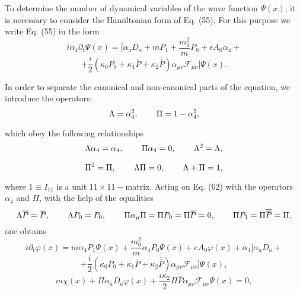 \documentclass[a4paper,12pt]{article}
\begin{document}
To determine the number of dynamical variables of the wave
function $\Psi(x)$, it is necessary to consider the Hamiltonian
form of Eq. (55). For this purpose we write Eq. (55) in the form
\[
i\alpha _4\partial _t\Psi (x)=\biggl [\alpha
_aD_a+mP_1+\frac{m_0^2}{m}P_0+eA_0\alpha _4+
\]
\vspace{-8mm}
\begin{equation}
\label{62}
\end{equation}
\vspace{-8mm}
\[
+\frac i2\left( \kappa _0P_0+\kappa _1\overline{P}+\kappa
_2\overline{ \overline{P}}\right) \alpha _{\mu \nu
}\mathcal{F}_{\mu \nu }\biggr ]\Psi (x).
\]

In order to separate the canonical and non-canonical parts of the
equation, we introduce the operators:
\begin{equation}
\Lambda =\alpha _4^2,\hspace{0.3in}\Pi =1-\alpha _4^2, \label{63}
\end{equation}

which obey the following relationships
\[
\Lambda \alpha _4=\alpha _4,\hspace{0.3in}\Pi \alpha
_4=0,\hspace{0.3in} \Lambda^2=\Lambda,
\]
\vspace{-8mm}
\begin{equation}
\label{64}
\end{equation}
\vspace{-8mm}
\[
\Pi^2=\Pi,\hspace{0.3in}\Lambda \Pi=0,\hspace{0.3in}\Lambda +\Pi
=1,
\]

where $1\equiv I_{11}$ is a unit $11\times 11-$matrix. Acting on
Eq. (62) with the operators $\alpha _4$ and $\Pi $, with the help
of the equalities
\[
\Lambda \overline{P}=\overline{P},\hspace{0.3in}\Lambda P_0=P_0,
\hspace{0.3in}\Pi \alpha _\mu \Pi =\Pi P_0=\Pi \overline{P}=0,
\hspace{0.3in}\Pi P_1=\Pi \overline{\overline{P}}=\Pi,
\]
one obtains
\[
i\partial _t\varphi (x)=m\alpha
_4P_1\Psi(x)+\frac{m_0^2}{m}\alpha_4 P_0\Psi(x)+eA_0\varphi
(x)+\alpha _4 \biggl [\alpha _aD_a+
\]
\vspace{-8mm}
\begin{equation}
\label{65}
\end{equation}
\vspace{-8mm}
\[
+\frac i2\left( \kappa _0P_0+\kappa _1\overline{P}+\kappa
_2\overline{ \overline{P}}\right) \alpha _{\mu \nu
}\mathcal{F}_{\mu \nu }\biggr ]\Psi (x),
\]
\begin{equation}
m\chi (x)+\Pi \alpha _aD_a\varphi (x)+\frac{i\kappa _2}2\Pi
\overline{ \overline{P}}\alpha _{\mu \nu }\mathcal{F}_{\mu \nu
}\Psi (x)=0, \label{66}
\end{equation}
\end{document}
